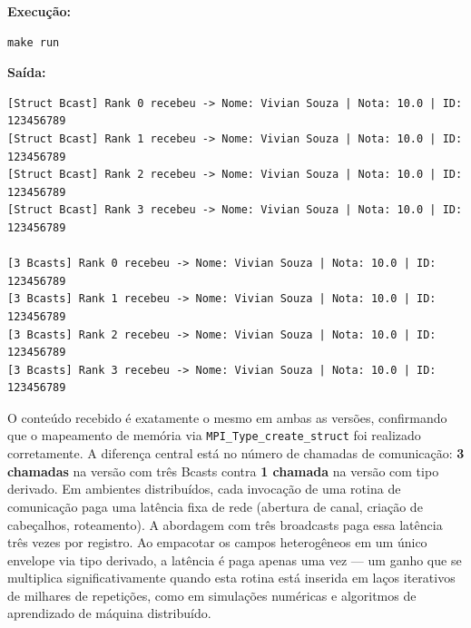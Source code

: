 \documentclass[12pt,a4paper]{article}
\begin{document}
\textbf{Execução:}
\begin{lstlisting}[style=shell]
make run
\end{lstlisting}

\textbf{Saída:}
\begin{lstlisting}[style=shell]
[Struct Bcast] Rank 0 recebeu -> Nome: Vivian Souza | Nota: 10.0 | ID: 123456789
[Struct Bcast] Rank 1 recebeu -> Nome: Vivian Souza | Nota: 10.0 | ID: 123456789
[Struct Bcast] Rank 2 recebeu -> Nome: Vivian Souza | Nota: 10.0 | ID: 123456789
[Struct Bcast] Rank 3 recebeu -> Nome: Vivian Souza | Nota: 10.0 | ID: 123456789

[3 Bcasts] Rank 0 recebeu -> Nome: Vivian Souza | Nota: 10.0 | ID: 123456789
[3 Bcasts] Rank 1 recebeu -> Nome: Vivian Souza | Nota: 10.0 | ID: 123456789
[3 Bcasts] Rank 2 recebeu -> Nome: Vivian Souza | Nota: 10.0 | ID: 123456789
[3 Bcasts] Rank 3 recebeu -> Nome: Vivian Souza | Nota: 10.0 | ID: 123456789
\end{lstlisting}

O conteúdo recebido é exatamente o mesmo em ambas as versões, confirmando que o mapeamento de memória via \texttt{MPI\_Type\_create\_struct} foi realizado corretamente. A diferença central está no número de chamadas de comunicação: \textbf{3 chamadas} na versão com três Bcasts contra \textbf{1 chamada} na versão com tipo derivado. Em ambientes distribuídos, cada invocação de uma rotina de comunicação paga uma latência fixa de rede (abertura de canal, criação de cabeçalhos, roteamento). A abordagem com três broadcasts paga essa latência três vezes por registro. Ao empacotar os campos heterogêneos em um único envelope via tipo derivado, a latência é paga apenas uma vez — um ganho que se multiplica significativamente quando esta rotina está inserida em laços iterativos de milhares de repetições, como em simulações numéricas e algoritmos de aprendizado de máquina distribuído.
\end{document}
